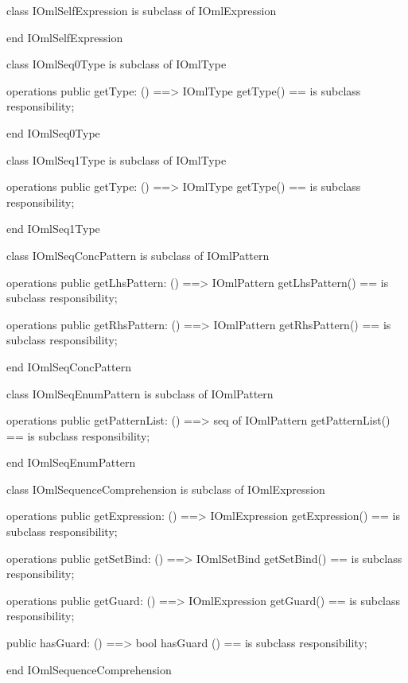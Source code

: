 \begin{vdm_al}
class IOmlSelfExpression
 is subclass of IOmlExpression

end IOmlSelfExpression
\end{vdm_al}

\begin{vdm_al}
class IOmlSeq0Type
 is subclass of IOmlType

operations
  public getType: () ==> IOmlType
  getType() == is subclass responsibility;

end IOmlSeq0Type
\end{vdm_al}

\begin{vdm_al}
class IOmlSeq1Type
 is subclass of IOmlType

operations
  public getType: () ==> IOmlType
  getType() == is subclass responsibility;

end IOmlSeq1Type
\end{vdm_al}

\begin{vdm_al}
class IOmlSeqConcPattern
 is subclass of IOmlPattern

operations
  public getLhsPattern: () ==> IOmlPattern
  getLhsPattern() == is subclass responsibility;

operations
  public getRhsPattern: () ==> IOmlPattern
  getRhsPattern() == is subclass responsibility;

end IOmlSeqConcPattern
\end{vdm_al}

\begin{vdm_al}
class IOmlSeqEnumPattern
 is subclass of IOmlPattern

operations
  public getPatternList: () ==> seq of IOmlPattern
  getPatternList() == is subclass responsibility;

end IOmlSeqEnumPattern
\end{vdm_al}

\begin{vdm_al}
class IOmlSequenceComprehension
 is subclass of IOmlExpression

operations
  public getExpression: () ==> IOmlExpression
  getExpression() == is subclass responsibility;

operations
  public getSetBind: () ==> IOmlSetBind
  getSetBind() == is subclass responsibility;

operations
  public getGuard: () ==> IOmlExpression
  getGuard() == is subclass responsibility;

  public hasGuard: () ==> bool
  hasGuard () == is subclass responsibility;

end IOmlSequenceComprehension
\end{vdm_al}

